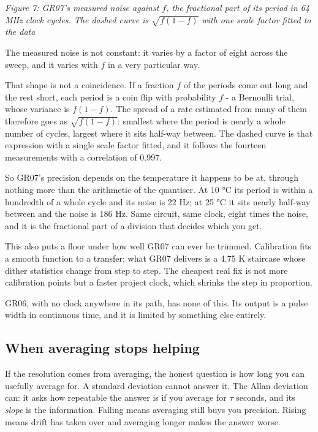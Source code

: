 \emph{Figure 7: GR07's measured noise against \(f\), the fractional part
of its period in 64 MHz clock cycles. The dashed curve is
\(\sqrt{f(1-f)}\) with one scale factor fitted to the data}

The measured noise is not constant: it varies by a factor of eight
across the sweep, and it varies with \(f\) in a very particular way.

That shape is not a coincidence. If a fraction \(f\) of the periods come
out long and the rest short, each period is a coin flip with probability
\(f\) - a Bernoulli trial, whose variance is \(f(1-f)\). The spread of a
rate estimated from many of them therefore goes as \(\sqrt{f(1-f)}\):
smallest where the period is nearly a whole number of cycles, largest
where it sits half-way between. The dashed curve is that expression with
a single scale factor fitted, and it follows the fourteen measurements
with a correlation of 0.997.

So GR07's precision depends on the temperature it happens to be at,
through nothing more than the arithmetic of the quantiser. At 10 °C its
period is within a hundredth of a whole cycle and its noise is 22 Hz; at
25 °C it sits nearly half-way between and the noise is 186 Hz. Same
circuit, same clock, eight times the noise, and it is the fractional
part of a division that decides which you get.

This also puts a floor under how well GR07 can ever be trimmed.
Calibration fits a smooth function to a transfer; what GR07 delivers is
a 4.75 K staircase whose dither statistics change from step to step. The
cheapest real fix is not more calibration points but a faster project
clock, which shrinks the step in proportion.

GR06, with no clock anywhere in its path, has none of this. Its output
is a pulse width in continuous time, and it is limited by something else
entirely.

\subsection{When averaging stops
helping}\label{when-averaging-stops-helping}

If the resolution comes from averaging, the honest question is how long
you can usefully average for. A standard deviation cannot answer it. The
Allan deviation can: it asks how repeatable the answer is if you average
for \(\tau\) seconds, and its \emph{slope} is the information. Falling
means averaging still buys you precision. Rising means drift has taken
over and averaging longer makes the answer worse.



